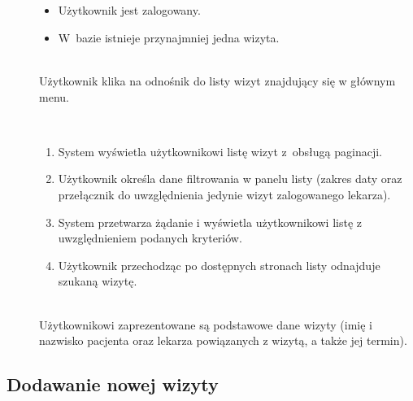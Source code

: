 \documentclass[11pt]{aghdpl}
\begin{document}
	\begin{description}
		\item[\useCaseAktor] \hfill \\
			\useCaseUzytkownik
		\item[\useCaseWarPocz] \hfill \\
		\begin{itemize}
			\item Użytkownik jest zalogowany.
			\item W~bazie istnieje przynajmniej jedna wizyta.
		\end{itemize}
			
		\item[\useCaseZdarzInicj] \hfill \\
			Użytkownik klika na odnośnik do listy wizyt znajdujący się w głównym menu.
		\item[\useCaseScenBaz] \hfill \\ 
			\begin{enumerate}
			\item System wyświetla użytkownikowi listę wizyt z~obsługą paginacji.
			\item Użytkownik określa dane filtrowania w panelu listy (zakres daty oraz przełącznik do uwzględnienia jedynie wizyt zalogowanego lekarza).
			\item System przetwarza żądanie i wyświetla użytkownikowi listę z uwzględnieniem podanych kryteriów.
			\item Użytkownik przechodząc po dostępnych stronach listy odnajduje szukaną wizytę.
			\end{enumerate}
		\item[\useCaseWarKonc] \hfill \\ 
			Użytkownikowi zaprezentowane są podstawowe dane wizyty (imię i nazwisko pacjenta oraz lekarza powiązanych z wizytą, a także jej termin).
	\end{description}

\subsection{Dodawanie nowej wizyty}
\end{document}
